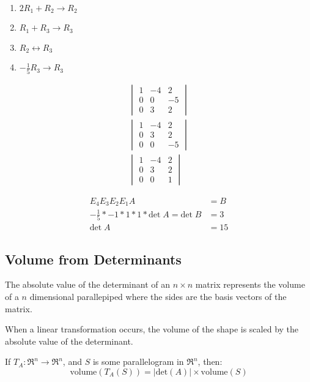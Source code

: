 \begin{enumerate}
    \item \(2R_1 + R_2 \rightarrow R_2\)
    \item \(R_1 + R_3 \rightarrow R_3\)
    \item \(R_2 \leftrightarrow R_3\)
    \item \(-\frac{1}{5} R_3 \rightarrow R_3\)
\end{enumerate}

\begin{align}
    \begin{vmatrix}
        1 & -4 & 2 \\
        0 & 0 & -5 \\
        0 & 3 & 2
    \end{vmatrix} \\
    \begin{vmatrix}
        1 & -4 & 2 \\
        0 & 3 & 2 \\
        0 & 0 & -5
    \end{vmatrix} \\
    \begin{vmatrix}
        1 & -4 & 2 \\
        0 & 3 & 2 \\
        0 & 0 & 1
    \end{vmatrix}
\end{align}

\begin{align}
    E_4 E_3 E_2 E_1 A &= B \\
    -\frac{1}{5} * -1 * 1 * 1 * \text{det} \; A = \text{det} \; B &= 3 \\
    \text{det} \; A &= 15
\end{align}

\subsection{Volume from Determinants}
The absolute value of the determinant of an \(n \times n\) matrix represents the volume of a \(n\) dimensional parallepiped where the sides are the basis vectors of the matrix.

When a linear transformation occurs, the volume of the shape is scaled by the absolute value of the determinant.

\begin{theorem}
    If \(T_A : \Re^n \rightarrow \Re^n\), and \(S\) is some parallelogram in \(\Re^n\), then:
    \[\text{volume}(T_A(S)) = | \text{det} (A) | \times \text{volume}(S)\]
\end{theorem}
